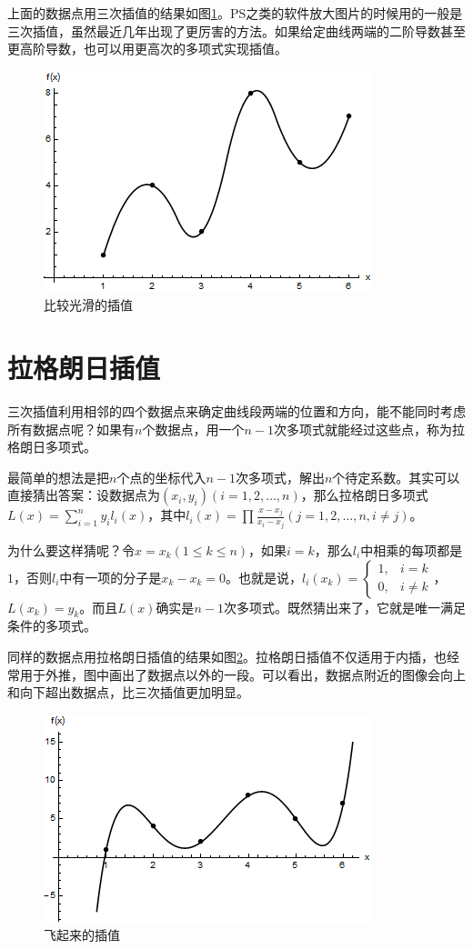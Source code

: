 上面的数据点用三次插值的结果如图\ref{fig-disc-data-cubic}。PS之类的软件放大图片的时候用的一般是三次插值，虽然最近几年出现了更厉害的方法。如果给定曲线两端的二阶导数甚至更高阶导数，也可以用更高次的多项式实现插值。
\begin{figure}[htb]
\centering
\includegraphics[scale=0.5]{fig/disc-data-cubic}
\caption{比较光滑的插值}
\label{fig-disc-data-cubic}
\end{figure}
\section{拉格朗日插值}
三次插值利用相邻的四个数据点来确定曲线段两端的位置和方向，能不能同时考虑所有数据点呢？如果有$n$个数据点，用一个$n-1$次多项式就能经过这些点，称为拉格朗日多项式。

最简单的想法是把$n$个点的坐标代入$n-1$次多项式，解出$n$个待定系数。其实可以直接猜出答案：设数据点为$(x_i,y_i)(i=1,2,\dots,n)$，那么拉格朗日多项式$L(x)=\sum_{i=1}^n y_i l_i(x)$，其中$l_i(x)=\prod \frac{x-x_j}{x_i-x_j}(j=1,2,\dots,n, i \ne j)$。

为什么要这样猜呢？令$x=x_k(1 \le k \le n)$，如果$i=k$，那么$l_i$中相乘的每项都是$1$，否则$l_i$中有一项的分子是$x_k-x_k=0$。也就是说，$l_i(x_k)=\begin{cases} 1, &i=k \\ 0, &i \ne k \end{cases}$，$L(x_k)=y_k$。而且$L(x)$确实是$n-1$次多项式。既然猜出来了，它就是唯一满足条件的多项式。

同样的数据点用拉格朗日插值的结果如图\ref{fig-disc-data-lag}。拉格朗日插值不仅适用于内插，也经常用于外推，图中画出了数据点以外的一段。可以看出，数据点附近的图像会向上和向下超出数据点，比三次插值更加明显。
\begin{figure}[htb]
\centering
\includegraphics[scale=0.5]{fig/disc-data-lag}
\caption{飞起来的插值}
\label{fig-disc-data-lag}
\end{figure}

